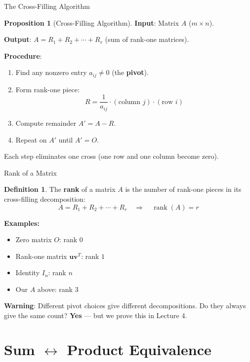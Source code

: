 \documentclass[10pt]{beamer}
\theoremstyle{definition}
\newtheorem{defi}{Definition}[section]
\newtheorem{prop}{Proposition}[section]
\newcommand{\x}[1]{\alert{\textbf{#1}}}
\begin{document}
\begin{frame}{The Cross-Filling Algorithm}
\begin{prop}[Cross-Filling Algorithm]
\textbf{Input}: Matrix $A$ ($m \times n$).

\textbf{Output}: $A = R_1 + R_2 + \cdots + R_r$ (sum of rank-one matrices).

\textbf{Procedure}:
\begin{enumerate}
\item Find any nonzero entry $a_{ij} \neq 0$ (the \x{pivot}).
\item Form rank-one piece:
$$R = \frac{1}{a_{ij}} \cdot (\text{column } j) \cdot (\text{row } i)$$
\item Compute remainder $A' = A - R$.
\item Repeat on $A'$ until $A' = O$.
\end{enumerate}
\end{prop}

\vfill
Each step eliminates one cross (one row and one column become zero).
\end{frame}

\begin{frame}{Rank of a Matrix}
\begin{defi}
The \x{rank} of a matrix $A$ is the number of rank-one pieces in its cross-filling decomposition:
$$A = R_1 + R_2 + \cdots + R_r \quad \Longrightarrow \quad \operatorname{rank}(A) = r$$
\end{defi}

\vfill
\textbf{Examples:}
\begin{itemize}
\item Zero matrix $O$: rank $0$
\item Rank-one matrix $\mathbf{u}\mathbf{v}^T$: rank $1$
\item Identity $I_n$: rank $n$
\item Our $A$ above: rank $3$
\end{itemize}

\vfill
\textbf{Warning}: Different pivot choices give different decompositions. Do they always give the same count? \x{Yes} — but we prove this in Lecture 4.
\end{frame}

\section{Sum $\leftrightarrow$ Product Equivalence}
\end{document}
